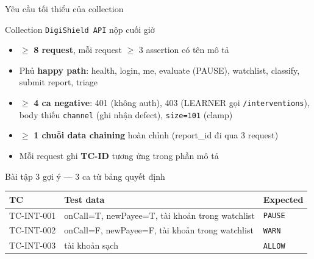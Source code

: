 \documentclass[aspectratio=169,12pt]{beamer}
\begin{document}
\begin{frame}[shrink=6]{Yêu cầu tối thiểu của collection}
  \begin{block}{Collection \texttt{DigiShield API} nộp cuối giờ}
    \begin{itemize}
      \item \(\geq\) \textbf{8 request}, mỗi request \(\geq\) 3 assertion có tên mô tả
      \item Phủ \textbf{happy path}: health, login, me, evaluate (PAUSE),
        watchlist, classify, submit report, triage
      \item \(\geq\) \textbf{4 ca negative}: 401 (không auth), 403 (LEARNER
        gọi \texttt{/interventions}), body thiếu \texttt{channel}
        (ghi nhận defect), \texttt{size=101} (clamp)
      \item \(\geq\) \textbf{1 chuỗi data chaining} hoàn chỉnh
        (report\_id đi qua 3 request)
      \item Mỗi request ghi \textbf{TC-ID} tương ứng trong phần mô tả
    \end{itemize}
  \end{block}

  \begin{exampleblock}{Bài tập 3 gợi ý --- 3 ca từ bảng quyết định}
    \small
    \begin{tabular}{p{2.1cm}p{5.6cm}p{2.6cm}}
      \toprule
      \textbf{TC} & \textbf{Test data} & \textbf{Expected} \\
      \midrule
      TC-INT-001 & onCall=T, newPayee=T, tài khoản trong watchlist & \texttt{PAUSE} \\
      TC-INT-002 & onCall=F, newPayee=F, tài khoản trong watchlist & \texttt{WARN} \\
      TC-INT-003 & tài khoản sạch & \texttt{ALLOW} \\
      \bottomrule
    \end{tabular}
  \end{exampleblock}
\end{frame}
\end{document}
